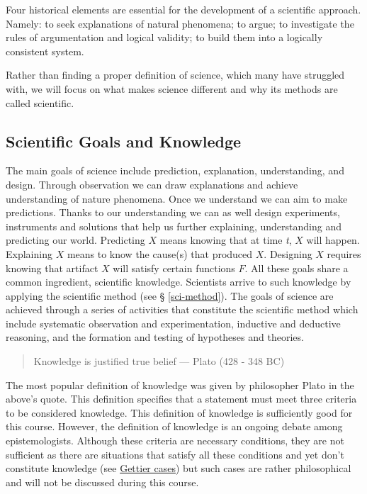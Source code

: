 \documentclass[
]{book}
\begin{document}
Four historical elements are essential for the development of a scientific approach. Namely: to seek explanations of natural phenomena; to argue; to investigate the rules of argumentation and logical validity; to build them into a logically consistent system. \citep{johansson2016philosophy}

Rather than finding a proper definition of science, which many have struggled with, we will focus on what makes science different and why its methods are called scientific.

\hypertarget{scientific-goals-and-knowledge}{%
\subsection{Scientific Goals and Knowledge}\label{scientific-goals-and-knowledge}}

The main goals of science include prediction, explanation, understanding, and design. Through observation we can draw explanations and achieve understanding of nature phenomena. Once we understand we can aim to make predictions. Thanks to our understanding we can as well design experiments, instruments and solutions that help us further explaining, understanding and predicting our world. Predicting \(X\) means knowing that at time \emph{t}, \(X\) will happen. Explaining \(X\) means to know the cause(s) that produced \(X\). Designing \(X\) requires knowing that artifact \(X\) will satisfy certain functions \(F\). All these goals share a common ingredient, scientific knowledge. Scientists arrive to such knowledge by applying the scientific method (see § \ref{sci-method}). The goals of science are achieved through a series of activities that constitute the scientific method which include systematic observation and experimentation, inductive and deductive reasoning, and the formation and testing of hypotheses and theories.

\begin{quote}
Knowledge is justified true belief --- Plato (428 - 348 BC)
\end{quote}

The most popular definition of knowledge was given by philosopher Plato in the above's quote. This definition specifies that a statement must meet three criteria to be considered knowledge. This definition of knowledge is sufficiently good for this course. However, the definition of knowledge is an ongoing debate among epistemologists. Although these criteria are necessary conditions, they are not sufficient as there are situations that satisfy all these conditions and yet don't constitute knowledge (see \href{https://en.wikipedia.org/wiki/Gettier_case}{Gettier cases}) but such cases are rather philosophical and will not be discussed during this course.
\end{document}
